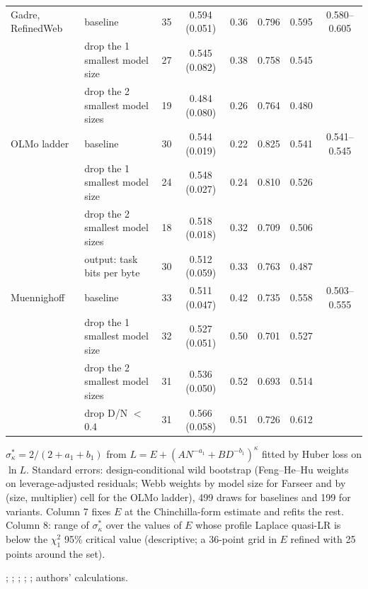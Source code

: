 \begin{table}[tp]
\begin{tabular*}{\textwidth}{@{\extracolsep{\fill}}llcccccc@{}}
\addlinespace
Gadre, RefinedWeb & baseline & 35 & 0.594 (0.051) & 0.36 & 0.796 & 0.595 & 0.580--0.605 \\
 & drop the 1 smallest model size & 27 & 0.545 (0.082) & 0.38 & 0.758 & 0.545 &  \\
 & drop the 2 smallest model sizes & 19 & 0.484 (0.080) & 0.26 & 0.764 & 0.480 &  \\
\addlinespace
OLMo ladder & baseline & 30 & 0.544 (0.019) & 0.22 & 0.825 & 0.541 & 0.541--0.545 \\
 & drop the 1 smallest model size & 24 & 0.548 (0.027) & 0.24 & 0.810 & 0.526 &  \\
 & drop the 2 smallest model sizes & 18 & 0.518 (0.018) & 0.32 & 0.709 & 0.506 &  \\
 & output: task bits per byte & 30 & 0.512 (0.059) & 0.33 & 0.763 & 0.487 &  \\
\addlinespace
Muennighoff & baseline & 33 & 0.511 (0.047) & 0.42 & 0.735 & 0.558 & 0.503--0.555 \\
 & drop the 1 smallest model size & 32 & 0.527 (0.051) & 0.50 & 0.701 & 0.527 &  \\
 & drop the 2 smallest model sizes & 31 & 0.536 (0.050) & 0.52 & 0.693 & 0.514 &  \\
 & drop D/N $<$ 0.4 & 31 & 0.566 (0.058) & 0.51 & 0.726 & 0.612 &  \\
\bottomrule
\end{tabular*}

\begin{tablenotes}
$\sigma^*_\kappa=2/(2+a_1+b_1)$ from $L=E+(AN^{-a_1}+BD^{-b_1})^\kappa$ fitted by Huber loss on $\ln L$. Standard errors: design-conditional wild bootstrap (Feng--He--Hu weights on leverage-adjusted residuals; Webb weights by model size for Farseer and by (size, multiplier) cell for the OLMo ladder), 499 draws for baselines and 199 for variants. Column 7 fixes $E$ at the Chinchilla-form estimate and refits the rest. Column 8: range of $\sigma^*_\kappa$ over the values of $E$ whose profile Laplace quasi-LR is below the $\chi^2_1$ 95\% critical value (descriptive; a 36-point grid in $E$ refined with 25 points around the set).
\end{tablenotes}

\begin{tablenotes}[Source]
\citet{hoffmann2022training}; \citet{li2025predictableb}; \citet{gadre2024language}; \citet{bhagia2024establishing}; \citet{muennighoff2023scaling}; authors' calculations.
\end{tablenotes}
\end{table}
